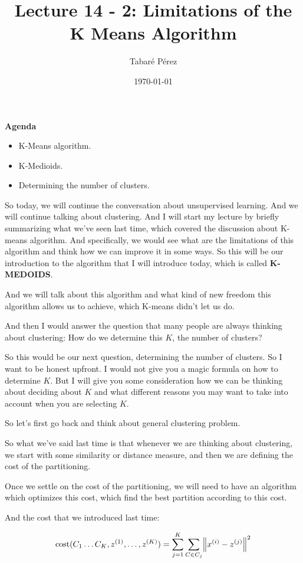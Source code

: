 \documentclass[a4paper, 12pt]{article}
\author{Tabaré Pérez}
\date{\today}
\title{Lecture 14 - 2: Limitations of the K Means Algorithm}
\begin{document}
\maketitle
\textbf{Agenda}

\begin{itemize}
\item K-Means algorithm.
\item K-Medioids.
\item Determining the number of clusters.
\end{itemize}

So today, we will continue the conversation about unsupervised learning. And we
will continue talking about clustering. And I will start my lecture by briefly
summarizing what we've seen last time, which covered the discussion about
K-means algorithm.
And specifically, we would see what are the limitations of this algorithm and
think how we can improve it in some ways. So this will be our introduction to
the algorithm that I will introduce today, which is called \textbf{K-MEDOIDS}.

And we will talk about this algorithm and what kind of new freedom this
algorithm allows us to achieve, which K-means didn't let us do.

And then I would answer the question that many people are always thinking about
clustering: How do we determine this \(K\), the number of clusters?

So this would be our next question, determining the number of clusters. So I
want to be honest upfront. I would not give you a magic formula on how to
determine \(K\). But I will give you some consideration how we can be thinking
about deciding about \(K\) and what different reasons you may want to take into
account when you are selecting \(K\).

So let's first go back and think about general clustering problem.

So what we've said last time is that whenever we are thinking about clustering,
we start with some similarity or distance measure, and then we are defining the
cost of the partitioning.

Once we settle on the cost of the partitioning, we will need to have an
algorithm which optimizes this cost, which find the best partition according to
this cost.

And the cost that we introduced last time:

\begin{equation}
\text{cost}(C_1 \ldots C_K, z^{(1)}, \ldots ,z^{(K)}) = \sum_{j=1}^{K} \sum_{C \in C_j} \norm{x^{(i)} - z^{(j)}}^2
\end{equation}
\end{document}
